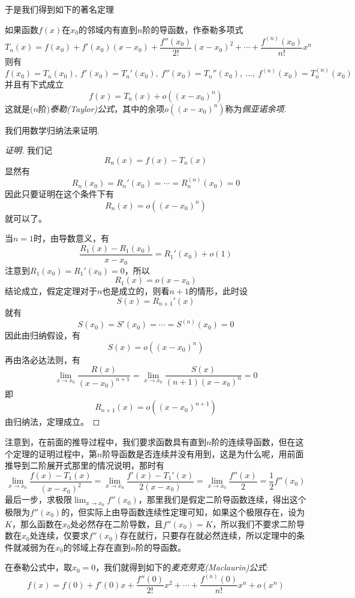 于是我们得到如下的著名定理
\begin{theorem}[泰勒(Taylor)定理]
  如果函数$f(x)$在$x_0$的邻域内有直到$n$阶的导函数，作泰勒多项式
\[ T_n(x) = f(x_0) + f'(x_0)(x-x_0)+\frac{f''(x_0)}{2!}(x-x_0)^2+ \cdots +\frac{f^{(n)}(x_0)}{n!}x^n \]
则有
\[ f(x_0)=T_n(x_0), \ f'(x_0) = T_n'(x_0), \  f''(x_0) = T_n''(x_0), \ \ldots, \  f^{(n)}(x_0) = T_n^{(n)}(x_0) \]
并且有下式成立
\[ f(x) = T_n(x) + o((x-x_0)^n) \]
这就是($n$阶)\emph{泰勒(Taylor)公式}，其中的余项$o((x-x_0)^n)$称为\emph{佩亚诺余项}.
\end{theorem}

我们用数学归纳法来证明.
\begin{proof}[证明]
  我们记
  \[ R_n(x) = f(x) - T_n(x) \]
  显然有
  \[ R_n(x_0) = R_n'(x_0) = \cdots = R_n^{(n)}(x_0) = 0 \]
  因此只要证明在这个条件下有
  \[ R_n(x) = o((x-x_0)^n) \]
  就可以了。
  
  当$n=1$时，由导数意义，有
  \[ \frac{R_1(x)-R_1(x_0)}{x-x_0} = R_1'(x_0) + o(1) \]
  注意到$R_1(x_0)=R_1'(x_0)=0$，所以
  \[ R_1(x) =  o(x-x_0) \]
  结论成立，假定定理对于$n$也是成立的，则看$n+1$的情形，此时设
  \[ S(x) = R_{n+1}'(x) \]
  就有
  \[ S(x_0) = S'(x_0) = \cdots = S^{(n)}(x_0) = 0 \]
  因此由归纳假设，有
  \[ S(x) = o((x-x_0)^n) \]
  再由洛必达法则，有
  \[ \lim_{x \to x_0} \frac{R(x)}{(x-x_0)^{n+1}} = \lim_{x \to x_0} \frac{S(x)}{(n+1)(x-x_0)^n} = 0 \]
  即
  \[ R_{n+1}(x) = o((x-x_0)^{n+1}) \]
  由归纳法，定理成立。
\end{proof}

注意到，在前面的推导过程中，我们要求函数具有直到$n$阶的连续导函数，但在这个定理的证明过程中，第$n$阶导函数是否连续并没有用到，这是为什么呢，用前面推导到二阶展开式那里的情况说明，那时有
\[ \lim_{x \to x_0} \frac{f(x)-T_1(x)}{(x-x_0)^2} = \lim_{x \to x_0} \frac{f'(x)-T_1'(x)}{2(x-x_0)} = \lim_{x \to x_0} \frac{f''(x)}{2} = \frac{1}{2} f''(x_0) \]
最后一步，求极限$\lim_{x \to x_0} f''(x_0)$，那里我们是假定二阶导函数连续，得出这个极限为$f''(x_0)$的，但实际上由导函数连续性定理可知，如果这个极限存在，设为$K$，那么函数在$x_0$处必然存在二阶导数，且$f''(x_0)=K$，所以我们不要求二阶导数在$x_0$处连续，仅要求$f''(x_0)$存在就行，只要存在就必然连续，所以定理中的条件就减弱为在$x_0$的邻域上存在直到$n$阶的导函数。

在泰勒公式中，取$x_0 = 0$，我们就得到如下的\emph{麦克劳克(Maclaurin)公式}:
\[ f(x) = f(0) + f'(0)x + \frac{f''(0)}{2!}x^2 + \cdots + \frac{f^{(n)}(0)}{n!}x^n + o(x^n) \]

